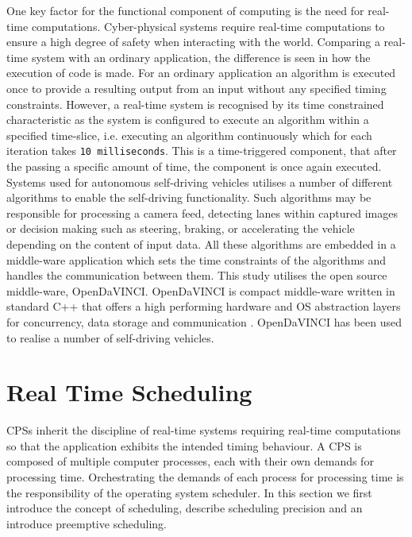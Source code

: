One key factor for the functional component of computing is the need for real-time computations. Cyber-physical systems require real-time computations to ensure a high degree of safety when interacting with the world. Comparing a real-time system with an ordinary application, the difference is seen in how the execution of code is made. For an ordinary application an algorithm is executed once to provide a resulting output from an input without any specified timing constraints. However, a real-time system is recognised by its time constrained characteristic as the system is configured to execute an algorithm within a specified time-slice, i.e. executing an algorithm continuously which for each iteration takes \texttt{10 milliseconds}. This is a time-triggered component, that after the passing a specific amount of time, the component is once again executed. \\

Systems used for autonomous self-driving vehicles utilises a number of different algorithms to enable the self-driving functionality. Such algorithms may be responsible for processing a camera feed, detecting lanes within captured images or decision making such as steering, braking, or accelerating the vehicle depending on the content of input data. All these algorithms are embedded in a middle-ware application which sets the time constraints of the algorithms and handles the communication between them. This study utilises the open source middle-ware, OpenDaVINCI. OpenDaVINCI is compact middle-ware written in standard C++ that offers a high performing hardware and OS abstraction layers for concurrency, data storage and communication \cite{OpenDaVINCI}. OpenDaVINCI has been used to realise a number of self-driving vehicles.


\section{Real Time Scheduling}


CPSs inherit the discipline of real-time systems requiring real-time computations so that the application exhibits the intended timing behaviour. A CPS is composed of multiple computer processes, each with their own demands for processing time. Orchestrating the demands of each process for processing time is the responsibility of the operating system scheduler. In this section we first introduce the concept of scheduling, describe scheduling precision and an introduce preemptive scheduling. 

